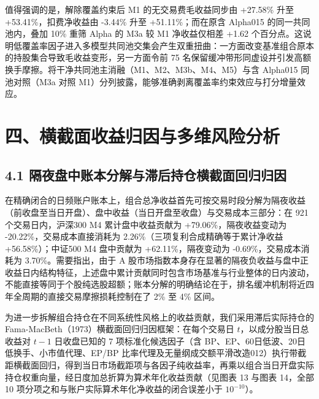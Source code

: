 \documentclass[12pt,a4paper]{article}
\let\origsection\section
\renewcommand{\section}[1]{\needspace{6.5\baselineskip}\origsection{#1}}
\let\origsubsection\subsection
\renewcommand{\subsection}[1]{\needspace{4\baselineskip}\origsubsection{#1}}
\begin{document}
值得强调的是，解除覆盖约束后 M1 的无交易费毛收益同步由 +27.58\% 升至 +53.41\%，扣费净收益由 -3.44\% 升至 +51.11\%；而在原含 Alpha015 的同一共同池内，叠加 10\% 重筛 Alpha 的 M3a 较 M1 净收益仅相差 +1.62 个百分点。这说明低覆盖率因子进入多模型共同池交集会产生双重扭曲：一方面改变基准组合原本的持股集合导致毛收益变形，另一方面令前 75 名保留缓冲带形同虚设并引发高额换手摩擦。将干净共同池主消融（M1、M2、M3b、M4、M5）与含 Alpha015 同池对照（M3a 对照 M1）分列披露，能够准确剥离覆盖率约束效应与打分增量效应。

\section{四、横截面收益归因与多维风险分析}

\subsection{4.1 隔夜盘中账本分解与滞后持仓横截面回归归因}

在精确闭合的日频账户账本上，组合总净收益首先可按交易时段分解为隔夜收益（前收盘至当日开盘）、盘中收益（当日开盘至收盘）与交易成本三部分：在 921 个交易日内，沪深300 M4 累计盘中收益贡献为 +79.06\%，隔夜收益变动为 -20.22\%，交易成本直接消耗为 2.26\%（三项复利合成精确等于累计净收益 +56.58\%）；中证500 M4 盘中贡献为 +62.11\%，隔夜变动为 -0.69\%，交易成本消耗为 3.70\%。需要指出，由于 A 股市场指数本身存在显著的隔夜负收益与盘中正收益日内结构特征，上述盘中累计贡献同时包含市场基准与行业整体的日内波动，不能直接等同于个股纯选股超额；账本分解的明确结论在于，排名缓冲机制将近四年全周期的直接交易摩擦损耗控制在了 2\% 至 4\% 区间。

为进一步拆解组合持仓在不同系统性风格上的收益贡献，我们采用滞后实际持仓的 Fama-MacBeth（1973）横截面回归归因框架：在每个交易日 $t$，以成分股当日总收益对 $t-1$ 日收盘已知的 7 项标准化候选因子（含 BP、EP、60日低波、20日低换手、小市值代理、EP/BP 比率代理及无量纲成交额平滑改造012）执行带截距横截面回归，得到当日市场截距项与各因子纯收益率，再乘以组合当日开盘实际持仓权重向量，经日度加总折算为算术年化收益贡献（见图表 13 与图表 14，全部 10 项分项之和与账户实际算术年化净收益的闭合误差小于 $10^{-10}$）。
\end{document}
